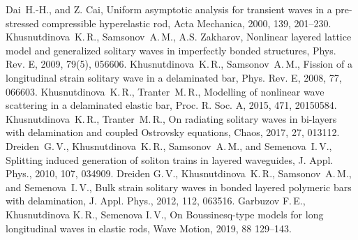 \documentclass[12pt, a4paper]{report}
\begin{document}
\begin{thebibliography}{99}
	 Dai~H.-H., and Z. Cai, Uniform asymptotic analysis for transient waves in a pre-stressed compressible hyperelastic rod, Acta Mechanica, 2000, 139, 201--230.
	 Khusnutdinova~K.\,R., Samsonov~A.\,M., A.S. Zakharov, Nonlinear layered lattice model and generalized solitary waves in imperfectly bonded structures, Phys. Rev. E, 2009, 79(5), 056606.
	 Khusnutdinova~K.\,R., Samsonov~A.\,M., Fission of a longitudinal strain solitary wave in a delaminated bar, Phys. Rev. E, 2008, 77, 066603.
	 Khusnutdinova~K.\,R., Tranter~M.\,R., Modelling of nonlinear wave scattering in a delaminated elastic bar, Proc. R. Soc. A, 2015, 471, 20150584.
	 Khusnutdinova~K.\,R., Tranter~M.\,R., On radiating solitary waves in bi-layers with delamination and coupled Ostrovsky equations, Chaos, 2017, 27, 013112.
	 Dreiden~G.\,V., Khusnutdinova~K.\,R., Samsonov~A.\,M., and Semenova~I.\,V., Splitting induced generation of soliton trains in layered waveguides, J. Appl. Phys., 2010, 107, 034909.
	 Dreiden G.\,V., Khusnutdinova~K.\,R., Samsonov~A.\,M., and Semenova~I.\,V., Bulk strain solitary waves in bonded layered polymeric bars with delamination, J. Appl. Phys., 2012, 112, 063516.
	 Garbuzov F.\,E., Khusnutdinova K.\,R., Semenova I.\,V., On Boussinesq-type models for long longitudinal waves in elastic rods, Wave Motion, 2019, 88 129--143.
	

\end{thebibliography}
\end{document}
